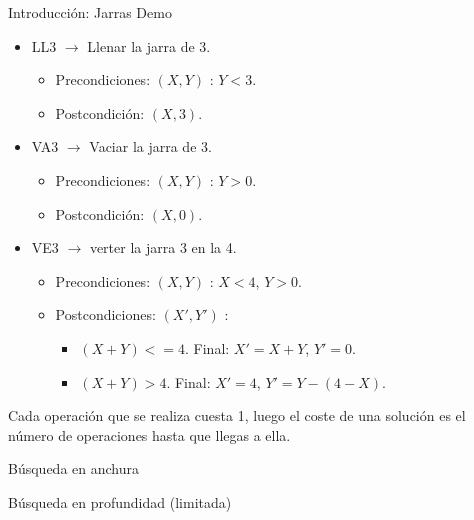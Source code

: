 \documentclass[11pt, a4paper, spanish, openright, twoside]{book}
\begin{document}
\begin{section}{Introducción: Jarras Demo}
\begin{itemize}
		\item LL3 $\rightarrow$ Llenar la jarra de 3.
			\begin{itemize}
			\item Precondiciones: $(X, Y)$ : $Y < 3$.
			\item Postcondición: $(X, 3)$.
			\end{itemize}
		
		\item VA3 $\rightarrow$ Vaciar la jarra de 3.
			\begin{itemize}
			\item Precondiciones: $(X, Y)$ : $Y > 0$.
			\item Postcondición: $(X, 0)$.
			\end{itemize}
		\item VE3 $\rightarrow$ verter la jarra 3 en la 4.
			\begin{itemize}
			\item Precondiciones: $(X, Y)$ : $X < 4$, $Y > 0$.
			\item Postcondiciones: $(X', Y')$ : 
				\begin{itemize}
					\item $(X + Y) <= 4$.  Final: $X'= X + Y$, $Y' = 0$.
					\item $(X + Y) > 4$. Final: $X'= 4$, $Y'= Y - (4 - X)$.
				\end{itemize}
			\end{itemize}
		\end{itemize}
	
	Cada operación que se realiza cuesta 1, luego el coste de una 
				solución es el número de operaciones hasta que llegas a ella.
		

		
\end{section}

\begin{section}{Búsqueda en anchura}


\end{section}

\begin{section}{Búsqueda en profundidad (limitada)}



\end{section}
\end{document}
